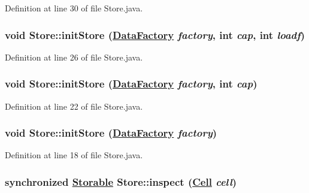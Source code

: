 Definition at line 30 of file Store.java.\hypertarget{classStore_d2}{
\subsubsection[initStore]{\setlength{\rightskip}{0pt plus 5cm}void Store::init\-Store (\hyperlink{interfaceDataFactory}{Data\-Factory} {\em factory}, int {\em cap}, int {\em loadf})}}
\label{classStore_d2}




Definition at line 26 of file Store.java.\hypertarget{classStore_d1}{
\subsubsection[initStore]{\setlength{\rightskip}{0pt plus 5cm}void Store::init\-Store (\hyperlink{interfaceDataFactory}{Data\-Factory} {\em factory}, int {\em cap})}}
\label{classStore_d1}




Definition at line 22 of file Store.java.\hypertarget{classStore_d0}{
\subsubsection[initStore]{\setlength{\rightskip}{0pt plus 5cm}void Store::init\-Store (\hyperlink{interfaceDataFactory}{Data\-Factory} {\em factory})}}
\label{classStore_d0}




Definition at line 18 of file Store.java.\hypertarget{classStore_a3}{
\subsubsection[inspect]{\setlength{\rightskip}{0pt plus 5cm}synchronized \hyperlink{interfaceStorable}{Storable} Store::inspect (\hyperlink{interfaceCell}{Cell} {\em cell})}}
\label{classStore_a3}




